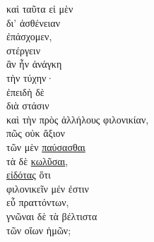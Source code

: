 {\large
\begin{greek}
\noindent καὶ ταῦτα εἰ μὲν \\
\tabto{2em} δι' ἀσθένειαν \\
ἐπάσχομεν, \\
\tabto{2em} στέργειν \\
ἂν ἦν ἀνάγκη \\
\tabto{2em} τὴν τύχην·\\
ἐπειδὴ δὲ \\
\tabto{2em} διὰ στάσιν \\
\tabto{2em} καὶ τὴν πρὸς ἀλλήλους φιλονικίαν, \\
πῶς οὐκ ἄξιον \\
\tabto{2em} τῶν μὲν \underline{παύσασθαι} \\
\tabto{2em} τὰ δὲ \underline{κωλῦσαι}, \\
\tabto{2em} \underline{εἰδότας} ὅτι \\
\tabto{4em} φιλονικεῖν μέν ἐστιν \\
\tabto{6em} εὖ πραττόντων, \\
\tabto{4em} γνῶναι δὲ τὰ βέλτιστα \\
\tabto{6em} τῶν οἵων ἡμῶν; \\

\end{greek}
}

